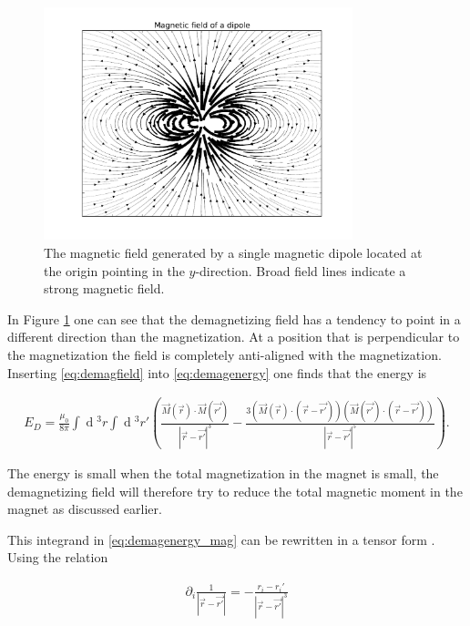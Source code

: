 \documentclass[1p]{elsarticle}		%
\renewcommand{\d}[1]{\ensuremath{\operatorname{d}\!{#1}}}
\numberwithin{equation}{section}
\begin{document}
\begin{figure}[h!]
\begin{center}
\includegraphics[width=0.8\textwidth]{Figures/dipole_field.pdf} 
\caption{The magnetic field generated by a single magnetic dipole located at the origin pointing in the $y$-direction. Broad field lines indicate a strong magnetic field.}
\label{fig:dipole_field} 
\end{center}
\end{figure}

In Figure \ref{fig:dipole_field} one can see that the demagnetizing field has a tendency to point in a different direction than the magnetization. At a position that is perpendicular to the magnetization the field is completely anti-aligned with the magnetization. Inserting \eqref{eq:demagfield} into \eqref{eq:demagenergy} one finds that the energy is

\begin{align}
\label{eq:demagenergy_mag}
E_D = \frac{\mu_0}{8\pi} \int \d {^3}r \int \d {^3}r' (\frac{\vec{M} (\vec{r}) \cdot \vec{M} (\vec{r'})}{|\vec{r}-\vec{r'}|^3} - \frac{3(\vec{M}(\vec{r}) \cdot (\vec{r}-\vec{r'})) (\vec{M}(\vec{r'}) \cdot(\vec{r}-\vec{r'}))}{|\vec{r}-\vec{r'}|^5}).
\end{align}

The energy is small when the total magnetization in the magnet is small, the demagnetizing field will therefore try to reduce the total magnetic moment in the magnet as discussed earlier. 

This integrand in \eqref{eq:demagenergy_mag} can be rewritten in a tensor form \cite{kruger2006current}. Using the relation

\begin{align}
\partial_i \frac{1}{|\vec{r}-\vec{r'}|} = -\frac{r_i-r_i'}{|\vec{r}-\vec{r'}|^3}
\end{align}
\end{document}
